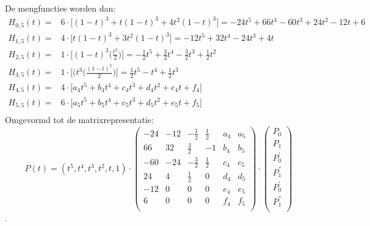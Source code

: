 \begin{itemize}
		De mengfuncties worden dan:
		\begin{equation*}
			\begin{split}
				H_{0, 5}(t) = & 6 \cdot \bigg[(1-t)^3 + t(1-t)^3 + 4t^2(1-t)^3\bigg] = -24t^5 + 66t^4 -60t^3 + 24t^2 -12t + 6\\
				H_{1, 5}(t) = & 4 \cdot \bigg[t(1-t)^3 + 3t^2(1-t)^3\bigg] = -12t^5 +32t^4 -24t^3 + 4t\\
				H_{2, 5}(t) = & 1 \cdot \bigg[(1 - t)^3\bigg(\frac{t^2}{2}\bigg)\bigg] = -\frac{1}{2}  t^5 + \frac{3}{2}  t^4  - \frac{3}{2}t^3 + \frac{1}{2}t^2\\
				H_{3, 5}(t) = & 1 \cdot \bigg[(t^3\bigg(\frac{(1-t)^2}{2}\bigg)\bigg] = \frac{1}{2}t^5 - t^4 + \frac{1}{2}t^3\\
				H_{4, 5}(t) = & 4 \cdot \bigg[a_4t^5 + b_4t^4 + c_4t^3 + d_4t^2 + e_4t + f_4 \bigg]  \\
				H_{5, 5}(t) = & 6 \cdot \bigg[a_5t^5 + b_5t^4 + c_5t^3 + d_5t^2 + e_5t + f_5 \bigg]  \\
			\end{split}
		\end{equation*}
		Omgevormd tot de matrixrepresentatie:
		$$
		P(t) = (t^5, t^4, t^3, t^2, t, 1) 
		\cdot
		\begin{pmatrix}
			-24 & -12 & - \frac{1}{2}  & \frac{1}{2} & a_4 & a_5 \\
			66  & 32  & \frac{3}{2}    & -1 		 & b_4 & b_5 \\
			-60 & -24 & - \frac{3}{2}  & \frac{1}{2} & c_4 & c_5 \\
			24  & 4   &  \frac{1}{2}   & 0 			 & d_4 & d_5 \\
			-12 & 0   & 0  			   & 0 			 & e_4 & e_5 \\
			6   & 0   & 0  			   & 0 			 & f_4 & f_5 \\
		\end{pmatrix}
		\cdot 
		\begin{pmatrix}
			P_0 \\
			P_1 \\
			P_0^{'} \\
			P_1^{''} \\
			P_0^{'} \\
			P_1^{''} \\

		\end{pmatrix}
		$$
		.



			
\end{itemize}